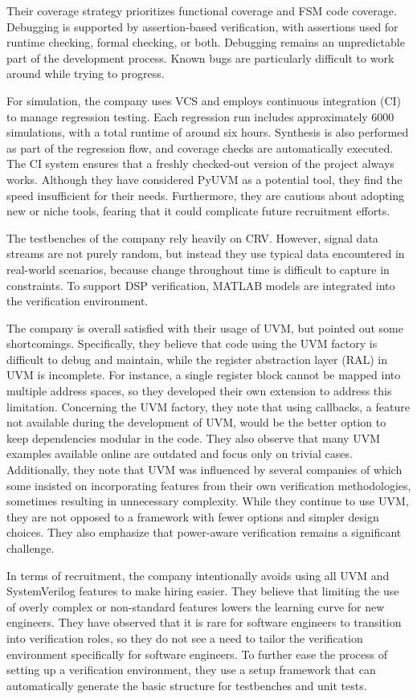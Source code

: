 \documentclass[11pt,a4paper]{report}
\begin{document}
Their coverage strategy prioritizes functional coverage and FSM code coverage. Debugging is supported by
assertion-based verification, with assertions used for runtime checking, formal checking, or both. Debugging remains
an unpredictable part of the development process. Known bugs are particularly difficult to work around while trying to progress.

For simulation, the company uses VCS and employs continuous integration (CI) to manage regression testing. Each
regression run includes approximately 6000 simulations, with a total runtime of around six hours. Synthesis is also
performed as part of the regression flow, and coverage checks are automatically executed. The CI system ensures that
a freshly checked-out version of the project always works. Although they have considered PyUVM as a potential tool,
they find the speed insufficient for their needs. Furthermore, they are cautious about adopting new or niche tools,
fearing that it could complicate future recruitment efforts.

The testbenches of the company rely heavily on CRV. However, signal data streams are not purely random, but instead
they use typical data encountered in real-world scenarios, because change throughout time is difficult to capture in
constraints. To support DSP verification, MATLAB models are integrated into the verification environment.

The company is overall satisfied with their usage of UVM, but pointed out some shortcomings. Specifically, they
believe that code using the UVM factory is difficult to debug and maintain, while the register abstraction layer
(RAL) in UVM is incomplete. For instance, a single register block cannot be mapped into multiple address spaces, so
they developed their own extension to address this limitation. Concerning the UVM factory, they note that using
callbacks, a feature not available during the development of UVM, would be the better option to keep dependencies
modular in the code. They also observe that many UVM examples available online are outdated and focus only on trivial
cases. Additionally, they note that UVM was influenced by several companies of which some insisted on incorporating
features from their own verification methodologies, sometimes resulting in unnecessary complexity. While they
continue to use UVM, they are not opposed to a framework with fewer options and simpler design choices. They
also emphasize that power-aware verification remains a significant challenge.

In terms of recruitment, the company intentionally avoids using all UVM and SystemVerilog features to make hiring
easier. They believe that limiting the use of overly complex or non-standard features lowers the learning curve for
new engineers. They have observed that it is rare for software engineers to transition into verification roles, so
they do not see a need to tailor the verification environment specifically for software engineers. To further ease
the process of setting up a verification environment, they use a setup framework that can automatically generate the
basic structure for testbenches and unit tests.
\end{document}
